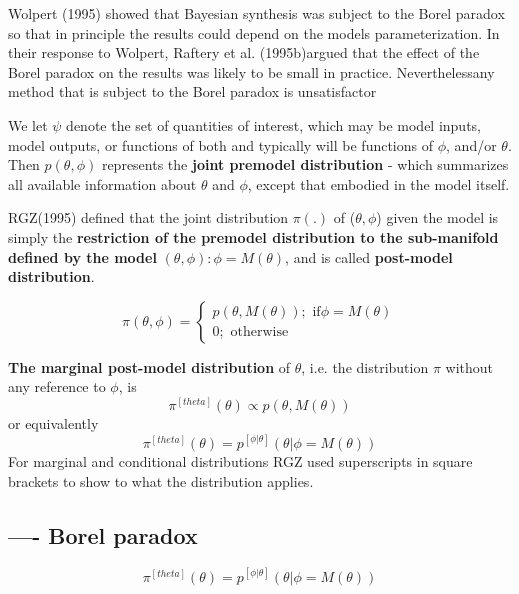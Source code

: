 Wolpert (1995) showed that Bayesian synthesis was subject to the Borel paradox
so that in principle the results could depend on the models parameterization.
In their response to Wolpert, Raftery et al. (1995b)argued that the effect
of the Borel paradox on the results was likely to be small in practice.
Neverthelessany method that is subject to the Borel paradox is unsatisfactor

 
We let $\psi$ denote the set of quantities of interest, which may be model
inputs, model outputs, or functions of both and typically will be functions of
$\phi$, and/or $\theta$. Then $p(\theta, \phi)$ represents the {\bf joint premodel distribution} - which
summarizes all available information about $\theta$ and $\phi$, except that embodied in the model itself. 

RGZ(1995) defined that the joint distribution $\pi(.)$ of ($\theta, \phi$) given
the model is simply the {\bf restriction of the premodel distribution to the
sub-manifold defined by the model } ${(\theta, \phi): \phi=M(\theta)}$, and is
called {\bf post-model distribution}.

\begin{equation}
\pi(\theta, \phi) = \left\{ 
\begin{array}{l}
p(\theta, M(\theta)) ; \text{ if} \phi = M(\theta) \\
0 ; \text{ otherwise} 
\end{array}
\right.
\end{equation}

{\bf The marginal post-model distribution} of $\theta$, i.e. the distribution
$\pi$ without any reference to $\phi$, is
\begin{equation} 
\pi^{[theta]}(\theta) \propto p(\theta, M(\theta))
\end{equation}
or equivalently
\begin{equation}
\pi^{[theta]}(\theta) = p^{[\phi|\theta]}(\theta| \phi = M(\theta))
\end{equation}
For marginal and conditional distributions RGZ used superscripts in square brackets to show to
what the distribution applies.

\subsection{---- Borel paradox}
\label{sec:Borel-paradox}

\begin{equation}
\pi^{[theta]}(\theta) = p^{[\phi|\theta]}(\theta| \phi = M(\theta))
\end{equation}

